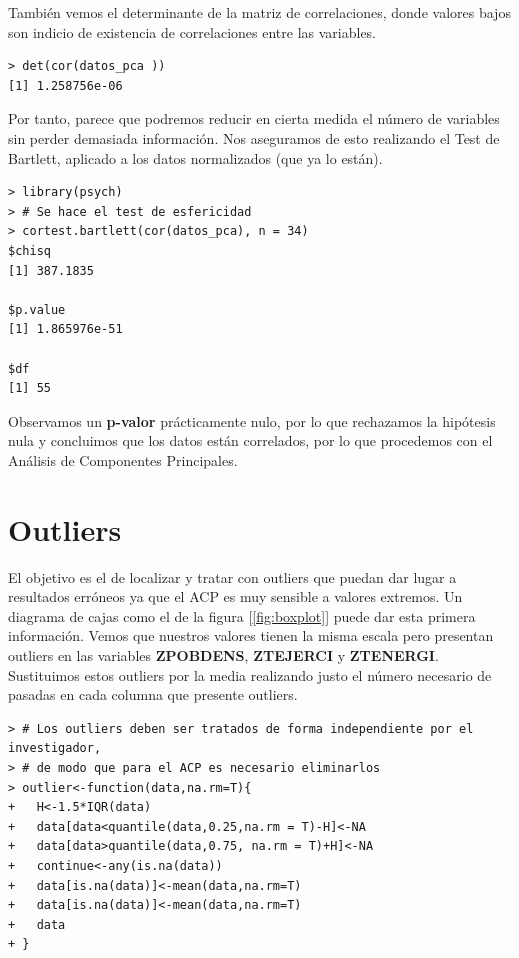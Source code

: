 \documentclass[12pt,twoside]{report}
\begin{document}
También vemos el determinante de la matriz de correlaciones, donde valores bajos son indicio de existencia de correlaciones entre las variables.

 \begin{lstlisting}
> det(cor(datos_pca ))
[1] 1.258756e-06
\end{lstlisting}

Por tanto, parece que podremos reducir en cierta medida el número de variables sin perder demasiada información. Nos aseguramos de esto realizando el Test de Bartlett, aplicado a los datos normalizados (que ya lo están).

 \begin{lstlisting}
> library(psych)
> # Se hace el test de esfericidad
> cortest.bartlett(cor(datos_pca), n = 34)
$chisq
[1] 387.1835

$p.value
[1] 1.865976e-51

$df
[1] 55
\end{lstlisting}

Observamos un \textbf{p-valor} prácticamente nulo, por lo que rechazamos la hipótesis nula y concluimos que los datos están correlados, por lo que procedemos con el Análisis de Componentes Principales.

\section*{Outliers}

El objetivo es el de localizar y tratar con outliers que puedan dar lugar a resultados erróneos ya que el ACP es muy sensible a valores extremos. Un diagrama de  cajas como el de la figura [\ref{fig:boxplot}] puede dar esta primera información. Vemos que nuestros valores tienen la misma escala pero presentan outliers en las variables \textbf{ZPOBDENS}, \textbf{ZTEJERCI} y  \textbf{ZTENERGI}. Sustituimos estos outliers por la media realizando justo el número necesario de pasadas en cada columna que presente outliers.

\begin{lstlisting}
> # Los outliers deben ser tratados de forma independiente por el investigador, 
> # de modo que para el ACP es necesario eliminarlos
> outlier<-function(data,na.rm=T){
+   H<-1.5*IQR(data)
+   data[data<quantile(data,0.25,na.rm = T)-H]<-NA
+   data[data>quantile(data,0.75, na.rm = T)+H]<-NA
+   continue<-any(is.na(data)) 
+   data[is.na(data)]<-mean(data,na.rm=T)
+   data[is.na(data)]<-mean(data,na.rm=T)
+   data
+ }
\end{lstlisting}
\end{document}
